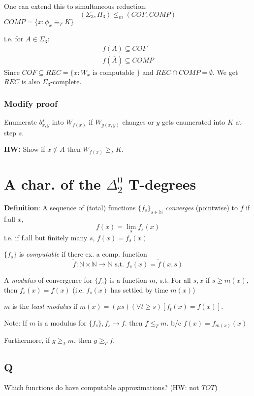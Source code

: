 \documentclass[12pt]{article}
\newcommand{\Nat}{\ensuremath{\mathbb{N}}}
\newcommand{\Conj}[1]{\ensuremath{\overline{#1}}}
\newcommand{\defn}{\textbf{Definition}: }
\begin{document}
One can extend this to simultaneous reduction:
\[
 (\Sigma_3, \Pi_3) \le_m (COF, COMP)
\]
$COMP = \{ x : \phi_x \equiv_T K \}$

i.e. for $A \in \Sigma_3$:
\begin{align*}
 f(A) \subseteq COF \\
 f(\Conj{A}) \subseteq COMP
\end{align*}
Since $ COF \subseteq REC = \{ x : W_x \text{ is computable } \}$
 and $REC \cap COMP = \emptyset$.
We get $REC$ is also $\Sigma_3$-complete.

\subsubsection*{Modify proof}
Enumerate $b^s_{x,y}$ into $W_{f(x)}$
if $W_{g(x,y)}$ changes or $y$ gets enumerated into $K$ at step $s$.

\textbf{HW:} Show if $x \not\in A$ then $W_{f(x)} \ge_T K$.

\section*{A char. of the $\Delta^0_2$ T-degrees}

\defn A sequence of (total) functions $\{ f_s \}_{s \in \Nat}$
\emph{converges} (pointwise) to $f$ if f.all $x$,
\[
 f(x) = \lim_s f_s(x)
\]
i.e. if f.all but finitely many $s$, $f(x) = f_s(x)$

\bigskip
$\{f_s\}$ is \emph{computable} if there ex. a comp. function
\[
 \tilde{f} : \Nat \times \Nat \rightarrow \Nat \text{ s.t. }
	f_s(x) = \tilde{f}(x,s)
\]

\bigskip
A \emph{modulus} of convergence for $\{f_s\}$ is a function $m$, s.t.
For all $s,x$
	if $s \ge m(x)$, 	then $f_s(x) = f(x)$
	(i.e. $f_s(x)$ has settled by time $m(x)$)

$m$ is the \emph{least modulus} if $m(x) = (\mu s) (\forall t \ge s) [f_t(x) = f(x)]$.

Note: If $m$ is a modulus for $\{f_s\}, f_s \rightarrow f$.
then $f \le_T m$.
%
b/c $f(x) = f_{m(x)}(x)$

Furthermore, if $g \ge_T m$, then $g \ge_T f$.

\subsection*{Q}
Which functions do have computable approximations? (HW: not $TOT$)
\end{document}
